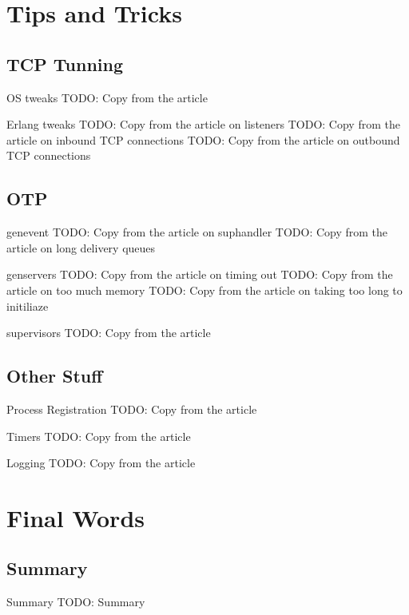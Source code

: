 \documentclass[utf8]{beamer}
\begin{document}
\section{Tips and Tricks}
\subsection{TCP Tunning}
\begin{frame}{OS tweaks}
	TODO: Copy from the article
\end{frame}
\begin{frame}{Erlang tweaks}
	TODO: Copy from the article on listeners
	TODO: Copy from the article on inbound TCP connections
	TODO: Copy from the article on outbound TCP connections
\end{frame}
\subsection{OTP}
\begin{frame}{gen\textunderscore event}
	TODO: Copy from the article on sup\textunderscore handler
	TODO: Copy from the article on long delivery queues
\end{frame}
\begin{frame}{gen\textunderscore servers}
	TODO: Copy from the article on timing out
	TODO: Copy from the article on too much memory
	TODO: Copy from the article on taking too long to initiliaze
\end{frame}
\begin{frame}{supervisors}
	TODO: Copy from the article
\end{frame}
\subsection{Other Stuff}
\begin{frame}{Process Registration}
	TODO: Copy from the article
\end{frame}
\begin{frame}{Timers}
	TODO: Copy from the article
\end{frame}
\begin{frame}{Logging}
	TODO: Copy from the article
\end{frame}

\section{Final Words}
\subsection{Summary}
\begin{frame}{Summary}
	TODO: Summary
\end{frame}
\end{document}
